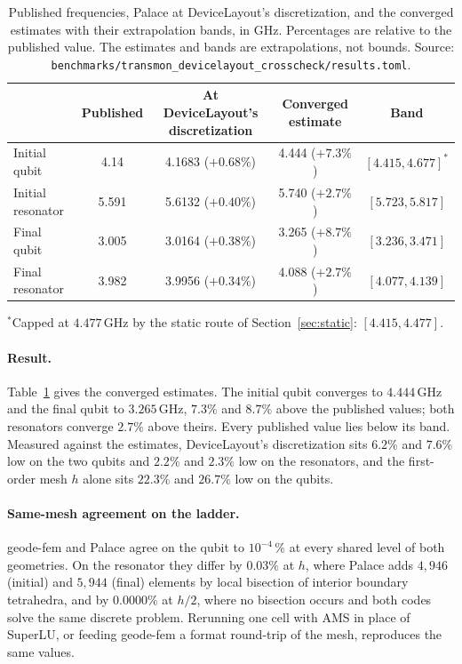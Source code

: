 \documentclass{anvil-paper}
\begin{document}
\begin{table}[tbp]
  \centering
  \caption{Published frequencies, Palace at DeviceLayout's discretization,
  and the converged estimates with their extrapolation bands, in GHz.
  Percentages are relative to the published value. The estimates and bands
  are extrapolations, not bounds. Source:
  \texttt{benchmarks/transmon\_devicelayout\_crosscheck/results.toml}.}
  \label{tab:crosscheck}
  \small
  \begin{tabular}{@{}lcccc@{}}
    \toprule
    & Published & At DeviceLayout's discretization & Converged estimate & Band \\
    \midrule
    Initial qubit & 4.14 & 4.1683 ($+0.68\%$) & 4.444 ($+7.3\%$) & $[4.415, 4.677]^{\ast}$ \\
    Initial resonator & 5.591 & 5.6132 ($+0.40\%$) & 5.740 ($+2.7\%$) & $[5.723, 5.817]$ \\
    Final qubit & 3.005 & 3.0164 ($+0.38\%$) & 3.265 ($+8.7\%$) & $[3.236, 3.471]$ \\
    Final resonator & 3.982 & 3.9956 ($+0.34\%$) & 4.088 ($+2.7\%$) & $[4.077, 4.139]$ \\
    \bottomrule
  \end{tabular}

  \smallskip
  {\footnotesize $^{\ast}$Capped at $4.477$\,GHz by the static route of
  Section~\ref{sec:static}: $[4.415, 4.477]$.}
\end{table}

\paragraph{Result.}
Table~\ref{tab:crosscheck} gives the converged estimates. The initial
qubit converges to $4.444$\,GHz and the final qubit to $3.265$\,GHz,
$7.3\%$ and $8.7\%$ above the published values; both resonators converge
$2.7\%$ above theirs. Every published value lies below its band. Measured
against the estimates, DeviceLayout's discretization sits $6.2\%$ and
$7.6\%$ low on the two qubits and $2.2\%$ and $2.3\%$ low on the
resonators, and the first-order mesh $h$ alone sits $22.3\%$ and $26.7\%$
low on the qubits.

\paragraph{Same-mesh agreement on the ladder.}
geode-fem and Palace agree on the qubit to $10^{-4}\,\%$ at every shared
level of both geometries. On the resonator they differ by $0.03\%$ at
$h$, where Palace adds $4{,}946$ (initial) and $5{,}944$ (final) elements
by local bisection of interior boundary tetrahedra, and by $0.0000\%$ at
$h/2$, where no bisection occurs and both codes solve the same discrete
problem. Rerunning one cell with AMS in place of SuperLU, or feeding
geode-fem a format round-trip of the mesh, reproduces the same values.
\end{document}

